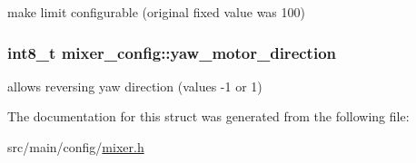 make limit configurable (original fixed value was 100) 

\hypertarget{structmixer__config_af5c1a0577e80ef6f5f2820506a906e24}{
\subsubsection[{yaw\+\_\+motor\+\_\+direction}]{\setlength{\rightskip}{0pt plus 5cm}int8\+\_\+t mixer\+\_\+config\+::yaw\+\_\+motor\+\_\+direction}}\label{structmixer__config_af5c1a0577e80ef6f5f2820506a906e24}


allows reversing yaw direction (values -\/1 or 1) 



The documentation for this struct was generated from the following file\+:\begin{DoxyCompactItemize}
\item 
src/main/config/\hyperlink{config_2mixer_8h}{mixer.\+h}\end{DoxyCompactItemize}

